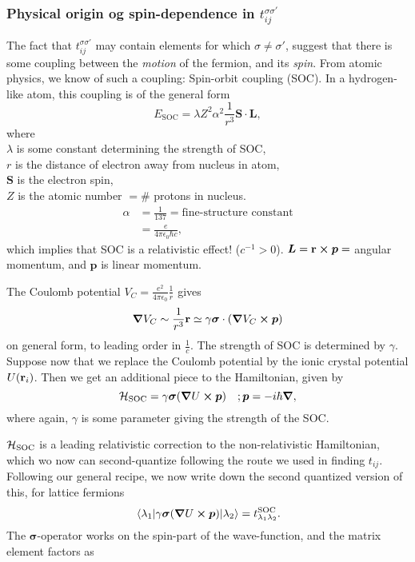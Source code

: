 \subsubsection*{Physical origin og spin-dependence in $t_{ij}^{\sigma\sigma'}$}
The fact that $t_{ij}^{\sigma\sigma'}$ may contain elements for which $\sigma \neq \sigma'$, suggest that there is some coupling between the \emph{motion} of the fermion, and its \emph{spin}. 
From atomic physics, we know of such a coupling: Spin-orbit coupling (SOC).
In a hydrogen-like atom, this coupling is of the general form 
\begin{equation}
	E_{\text{SOC}} = \lambda Z^2\alpha^2\frac{1}{r^3} \bm{S}\cdot \bm{L},
\end{equation}
where\\
$\lambda$ is some constant determining the strength of SOC,\\
$r$ is the distance of electron away from nucleus in atom,\\
$\bm{S}$ is the electron spin, \\
$Z$ is the atomic number $=\#$ protons in nucleus.
\begin{align*}
	\alpha &= \frac{1}{137} =  \text{fine-structure constant} \\
	&= \frac{e}{4\pi\epsilon_0\hbar c},
\end{align*}
which implies that SOC is a relativistic effect! ($c^{-1}>0$).
$\bm{L} = \vb{r}\cross\bm{p} = $ angular momentum, and $\bm{p}$ is linear momentum.

The Coulomb potential $V_{C} = \frac{e^2}{4\pi\epsilon_0}\frac{1}{r}$ gives
\begin{equation}
	\grad{V_{C}} \sim \frac{1}{r^3}\vb{r} \simeq \gamma \bm{\sigma}\cdot (\grad{V_{C}}\cross \bm{p})
\end{equation}
on general form, to leading order in $\frac{1}{c}$. The strength of SOC is determined by $\gamma$.
Suppose now that we replace the Coulomb potential by the ionic crystal potential $U(\vb{r}_i)$. Then we get an additional piece to the Hamiltonian, given by
\begin{equation}
	\mathcal{H}_{\text{SOC}} = \gamma \bm{\sigma}(\grad{U}\cross \bm{p}) \quad ; \bm{p} = -i\hbar\grad,
\end{equation}
where again, $\gamma$ is some parameter giving the strength of the SOC.

$\mathcal{H}_{\text{SOC}}$ is a leading relativistic correction to the non-relativistic Hamiltonian, which wo now can second-quantize following the route we used in finding $t_{ij}$. 
Following our general recipe, we now write down the second quantized version of this, for lattice fermions
\begin{equation}
	\mel{\lambda_{1}}{\gamma \bm{\sigma}(\grad{U}\cross \bm{p})}{\lambda_2} = t_{\lambda_1\lambda_2}^{\text{SOC}}.
\end{equation}
The $\bm{\sigma}$-operator works on the spin-part of the wave-function, and the matrix element factors as

